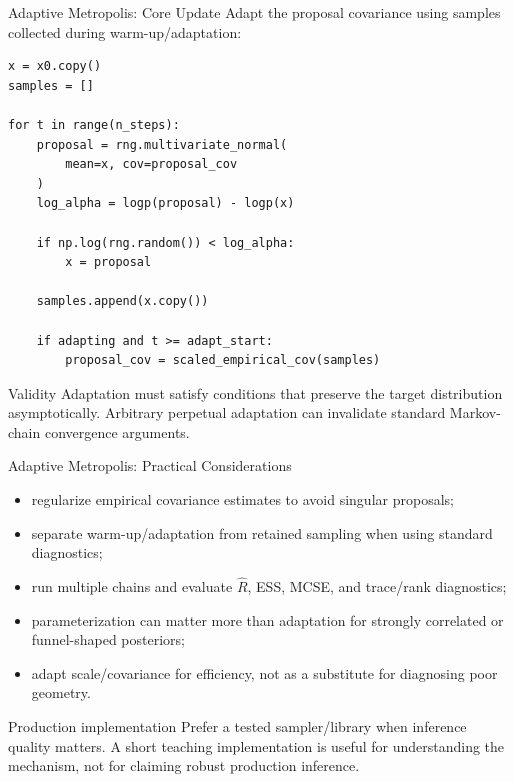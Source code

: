 \documentclass[aspectratio=169,11pt]{beamer}
\begin{document}
\begin{frame}[fragile]{Adaptive Metropolis: Core Update}
Adapt the proposal covariance using samples collected during warm-up/adaptation:

\begin{lstlisting}[style=code,basicstyle=\ttfamily\small]
x = x0.copy()
samples = []

for t in range(n_steps):
    proposal = rng.multivariate_normal(
        mean=x, cov=proposal_cov
    )
    log_alpha = logp(proposal) - logp(x)

    if np.log(rng.random()) < log_alpha:
        x = proposal

    samples.append(x.copy())

    if adapting and t >= adapt_start:
        proposal_cov = scaled_empirical_cov(samples)
\end{lstlisting}

\begin{alertblock}{Validity}
Adaptation must satisfy conditions that preserve the target distribution asymptotically. Arbitrary perpetual adaptation can invalidate standard Markov-chain convergence arguments.
\end{alertblock}
\end{frame}

\begin{frame}{Adaptive Metropolis: Practical Considerations}
\begin{itemize}
  \item regularize empirical covariance estimates to avoid singular proposals;
  \item separate warm-up/adaptation from retained sampling when using standard diagnostics;
  \item run multiple chains and evaluate $\hat R$, ESS, MCSE, and trace/rank diagnostics;
  \item parameterization can matter more than adaptation for strongly correlated or funnel-shaped posteriors;
  \item adapt scale/covariance for efficiency, not as a substitute for diagnosing poor geometry.
\end{itemize}

\begin{block}{Production implementation}
Prefer a tested sampler/library when inference quality matters. A short teaching implementation is useful for understanding the mechanism, not for claiming robust production inference.
\end{block}
\end{frame}
\end{document}
